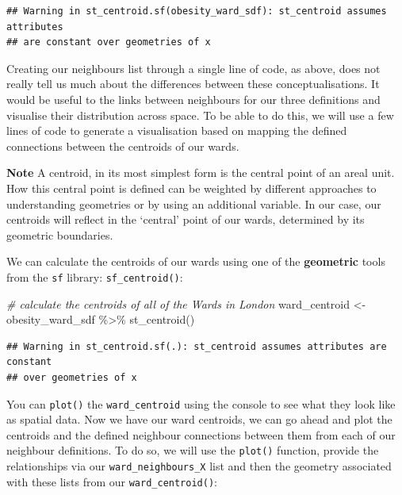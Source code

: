 \documentclass[
]{book}
\newenvironment{Shaded}{\begin{snugshade}}{\end{snugshade}}
\newcommand{\CommentTok}[1]{\textcolor[rgb]{0.56,0.35,0.01}{\textit{#1}}}
\newcommand{\FunctionTok}[1]{\textcolor[rgb]{0.00,0.00,0.00}{#1}}
\newcommand{\NormalTok}[1]{#1}
\newcommand{\OtherTok}[1]{\textcolor[rgb]{0.56,0.35,0.01}{#1}}
\newcommand{\SpecialCharTok}[1]{\textcolor[rgb]{0.00,0.00,0.00}{#1}}
\begin{document}
\begin{verbatim}
## Warning in st_centroid.sf(obesity_ward_sdf): st_centroid assumes attributes
## are constant over geometries of x
\end{verbatim}

Creating our neighbours list through a single line of code, as above, does not really tell us much about the differences between these conceptualisations. It would be useful to the links between neighbours for our three definitions and visualise their distribution across space. To be able to do this, we will use a few lines of code to generate a visualisation based on mapping the defined connections between the centroids of our wards.

\textbf{Note}
A centroid, in its most simplest form is the central point of an areal unit. How this central point is defined can be weighted by different approaches to understanding geometries or by using an additional variable. In our case, our centroids will reflect in the `central' point of our wards, determined by its geometric boundaries.

We can calculate the centroids of our wards using one of the \textbf{geometric} tools from the \texttt{sf} library: \texttt{sf\_centroid()}:

\begin{Shaded}
\begin{Highlighting}[]
\CommentTok{\# calculate the centroids of all of the Wards in London}
\NormalTok{ward\_centroid }\OtherTok{\textless{}{-}}\NormalTok{ obesity\_ward\_sdf }\SpecialCharTok{\%\textgreater{}\%}
    \FunctionTok{st\_centroid}\NormalTok{()}
\end{Highlighting}
\end{Shaded}

\begin{verbatim}
## Warning in st_centroid.sf(.): st_centroid assumes attributes are constant
## over geometries of x
\end{verbatim}

You can \texttt{plot()} the \texttt{ward\_centroid} using the console to see what they look like as spatial data. Now we have our ward centroids, we can go ahead and plot the centroids and the defined neighbour connections between them from each of our neighbour definitions. To do so, we will use the \texttt{plot()} function, provide the relationships via our \texttt{ward\_neighbours\_X} list and then the geometry associated with these lists from our \texttt{ward\_centroid()}:
\end{document}
